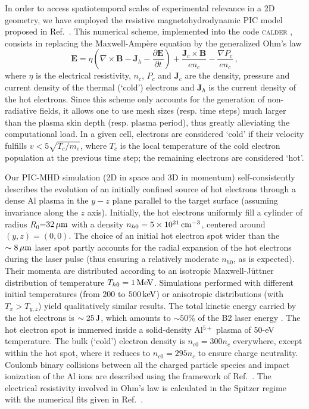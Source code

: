 \documentclass[aps,twocolumn,showpacs,superscriptaddress]{revtex4}
\begin{document}
In order to access spatiotemporal scales of experimental relevance in a 2D geometry, we have employed the resistive magnetohydrodynamic PIC model proposed in Ref.~\cite{JCP_Cohen_2010}. This numerical scheme, implemented into the code \textsc{calder} \cite{NF_Lefebvre_2003}, consists in replacing the Maxwell-Amp\`ere equation by the generalized Ohm's law
\begin{equation} \label{eq:PICMHD}
  \mathbf{E}=\eta \left(\nabla \times \mathbf{B}-\mathbf{J}_h-\frac{\partial \mathbf{E}}{\partial t}\right)+\frac{\mathbf{J}_c\times \mathbf{B}}{en_c}
  -\frac{\nabla P_c}{en_c} \,,
\end{equation}
where $\eta$ is the electrical resistivity, $n_c$, $P_c$ and $\mathbf{J}_c$ are the density, pressure and current density of the thermal (`cold') electrons and $\mathbf{J}_h$ is the current density of the hot electrons. Since this scheme only accounts for the generation of non-radiative fields, it allows one to use mesh sizes (resp. time steps) much larger than the plasma skin depth (resp. plasma period), thus greatly alleviating the computational load. In a given cell, electrons are considered `cold' if their velocity fulfills $v<5\sqrt{T_c/m_e}$, where $T_c$ is the local temperature of the cold electron population at the previous time step; the remaining electrons are considered `hot'.

Our PIC-MHD simulation (2D in space and 3D in momentum) self-consistently describes the evolution of an initially confined source of hot electrons through a dense Al plasma in the $y-z$ plane parallel to the target surface (assuming invariance along the $z$ axis). Initially, the hot electrons uniformly fill a cylinder of radius $R_{0}$=$32\,\rm \mu m$  with a density $n_{h0}=5\times 10^{21}\,\rm cm^{-3}$, centered around $(y,z)=(0,0)$. The choice of an initial hot electron spot wider than the $\sim 8\,\rm \mu m$ laser spot partly accounts for the radial expansion of the hot electrons during the laser pulse \cite{PRE_Stephens_2004} (thus ensuring a relatively moderate $n_{h0}$, as is expected). Their momenta are distributed according to an isotropic Maxwell-J\"uttner distribution of temperature $T_{h0}=1\,\rm MeV$. Simulations performed with different initial temperatures (from $200$ to $500\,\rm keV$) or anisotropic distributions (with $T_x>T_{y,z}$) yield qualitatively similar results. The total kinetic energy carried by the hot electrons is $\sim 25\,\rm J$, which amounts to $\sim 50\%$ of the B2 laser energy \cite{PRL_Ping_2008}. The hot electron spot is immersed inside a solid-density Al$^{5+}$ plasma of \mbox{50-eV} temperature. The bulk (`cold') electron density is $n_{c0}=300n_c$ everywhere, except within the hot spot, where it reduces to $n_{c0}=295n_c$ to ensure charge neutrality. Coulomb binary collisions between all the charged particle species and impact ionization of the Al ions are described using the framework of Ref.~\cite{POP_Perez_2012}. The electrical resistivity involved in Ohm's law is calculated in the Spitzer regime with the numerical fits given in Ref.~\cite{Decoster_1998}. 
\end{document}
